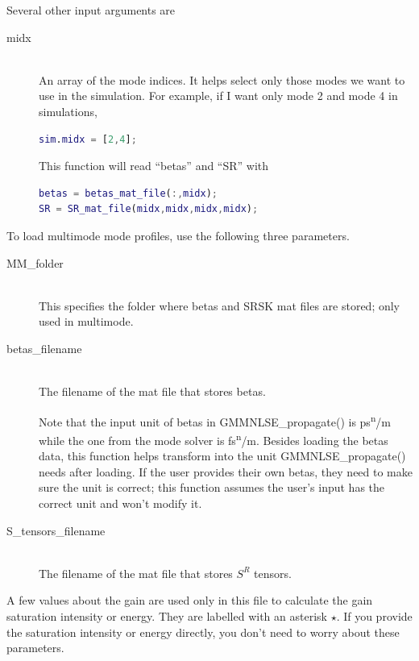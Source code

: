 \documentclass[12pt,hidelinks]{book}
\begin{document}
Several other input arguments are
\begin{description}
\item[midx]\mbox{}\\
An array of the mode indices. It helps select only those modes we want to use in the simulation. For example, if I want only mode 2 and mode 4 in simulations,
\begin{lstlisting}[language=MATLAB]
sim.midx = [2,4];
\end{lstlisting}
This function will read ``betas'' and ``SR'' with
\begin{lstlisting}[language=MATLAB]
betas = betas_mat_file(:,midx);
SR = SR_mat_file(midx,midx,midx,midx);
\end{lstlisting}
\end{description}

To load multimode mode profiles, use the following three parameters.
\begin{description}
\item[MM\_folder]\mbox{}\\
This specifies the folder where betas and SRSK mat files are stored; only used in multimode.

\item[betas\_filename]\mbox{}\\
The filename of the mat file that stores betas.

Note that the input unit of betas in GMMNLSE\_propagate() is \si{ps^n/\m} while the one from the mode solver is \si{fs^n/\m}. Besides loading the betas data, this function helps transform into the unit GMMNLSE\_propagate() needs after loading. If the user provides their own betas, they need to make sure the unit is correct; this function assumes the user's input has the correct unit and won't modify it.

\item[S\_tensors\_filename]\mbox{}\\
The filename of the mat file that stores $S^R$ tensors.
\end{description}

A few values about the gain are used only in this file to calculate the gain saturation intensity or energy. They are labelled with an asterisk $\star$. If you provide the saturation intensity or energy directly, you don't need to worry about these parameters.
\end{document}
